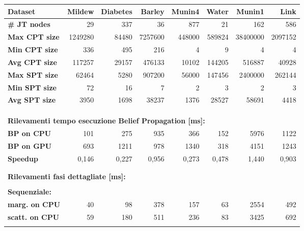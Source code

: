 \documentclass[a4paper]{article}   %
\begin{document}
\begin{table}
\small
\centering
\begin{tabular}{ l | r | r | r | r | r | r | r }
\textbf{Dataset} & \textbf{Mildew} & \textbf{Diabetes} & \textbf{Barley} & \textbf{Munin4} & \textbf{Water} & \textbf{Munin1} & \textbf{Link} \\
  \hline
\textbf{\# JT nodes} & 29 & 337 & 36 &  877 & 21 & 162 & 586 \\
  \hline
\textbf{Max CPT size} & 1249280 & 84480 & 7257600  & 448000 & 589824 & 38400000 & 2097152 \\
\hline
\textbf{Min CPT size} & 336 &	495 &	216 &		4	& 9	&	4	& 4 \\

\hline
\textbf{Avg CPT size} & 117257 &	29157 &	476133 &	10102 &	144205	&	516887 &	40928 \\
  \hline
\textbf{Max SPT size} & 62464	& 5280 &	907200 &		56000 &	147456 &		2400000 &	262144 \\
\hline
\textbf{Min SPT size} & 72	& 16 &	7	&	2 &	3	&	2 &	3 \\
\hline
\textbf{Avg SPT size}  & 3950 &	1698	& 38237	&	1376	& 28527 &		58691 &	4418 \\
 \\
\multicolumn{8}{l}{ }	\\
\multicolumn{8}{l}{ }	\\								

\multicolumn{8}{l}{ \textbf{Rilevamenti tempo esecuzione Belief Propagation [ms]:}}	\\		
\hline
\textbf{BP on CPU} & 101 &	275 &	935	&	366 &	152	&	5976 &	1122 \\
\hline
\textbf{BP on GPU} & 693 &	1211 &	978	&		1340 &	318	&	4151 &	1243 \\
\hline
\textbf{Speedup} & 0,146 &	0,227 &	0,956	&	0,273 &	0,478	&	1,440 &	0,903 \\
\multicolumn{8}{l}{ }	\\	
\multicolumn{8}{l}{ }	\\								

\multicolumn{8}{l}{\textbf{Rilevamenti fasi dettagliate [ms]:}} \\
\multicolumn{8}{l}{ }	\\								
\multicolumn{8}{l}{\textbf{Sequenziale:}} \\
\hline
\textbf{marg. on CPU} &	40 & 	98 &	378 &		157 &	63	&	2554 &	492 \\
\hline
\textbf{scatt. on CPU} &	59 &	180 &	511	 &		236 &	83 &		3425 &	692 \\
\multicolumn{8}{l}{ }	\\								


\end{tabular}
\end{table}
\end{document}

